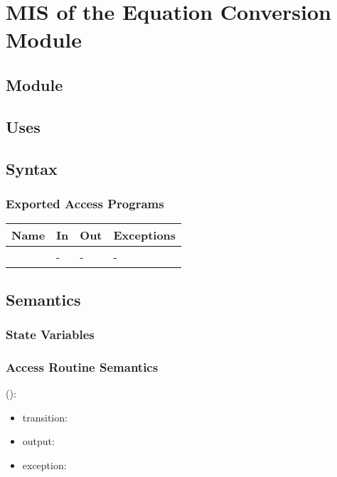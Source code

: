 \documentclass[12pt, titlepage]{article}
\begin{document}
\newpage

\section{MIS of the Equation Conversion Module} 
\label{Module_equationconversion}

\subsection{Module}


\subsection{Uses}


\subsection{Syntax}

\subsubsection{Exported Access Programs}

\begin{center}
	\begin{tabular}{p{3cm} p{4cm} p{4cm} p{2cm}}
		\hline
		\textbf{Name} & \textbf{In} & \textbf{Out} & \textbf{Exceptions} \\
		\hline
		\wss{accessProg} & - & - & - \\
		\hline
	\end{tabular}
\end{center}

\subsection{Semantics}

\subsubsection{State Variables}


\subsubsection{Access Routine Semantics}

\noindent {}():
\begin{itemize}
	\item transition:  
	\item output:  
	\item exception:  
\end{itemize}
\end{document}
